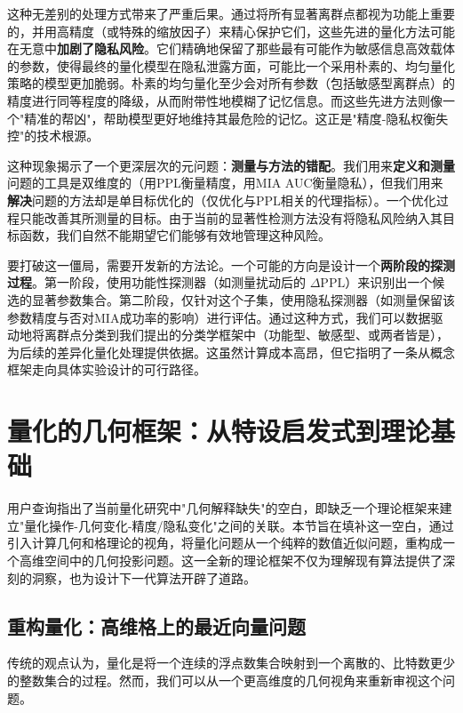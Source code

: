 \documentclass[letterpaper,twocolumn,10pt]{article}
\begin{document}
这种无差别的处理方式带来了严重后果。通过将所有显著离群点都视为功能上重要的，并用高精度（或特殊的缩放因子）来精心保护它们，这些先进的量化方法可能在无意中\textbf{加剧了隐私风险}。它们精确地保留了那些最有可能作为敏感信息高效载体的参数，使得最终的量化模型在隐私泄露方面，可能比一个采用朴素的、均匀量化策略的模型更加脆弱。朴素的均匀量化至少会对所有参数（包括敏感型离群点）的精度进行同等程度的降级，从而附带性地模糊了记忆信息。而这些先进方法则像一个"精准的帮凶"，帮助模型更好地维持其最危险的记忆。这正是"精度-隐私权衡失控"的技术根源。

这种现象揭示了一个更深层次的元问题：\textbf{测量与方法的错配}。我们用来\textbf{定义和测量}问题的工具是双维度的（用PPL衡量精度，用MIA AUC衡量隐私），但我们用来\textbf{解决}问题的方法却是单目标优化的（仅优化与PPL相关的代理指标）。一个优化过程只能改善其所测量的目标。由于当前的显著性检测方法没有将隐私风险纳入其目标函数，我们自然不能期望它们能够有效地管理这种风险。

要打破这一僵局，需要开发新的方法论。一个可能的方向是设计一个\textbf{两阶段的探测过程}。第一阶段，使用功能性探测器（如测量扰动后的 $\Delta \text{PPL}$）来识别出一个候选的显著参数集合。第二阶段，仅针对这个子集，使用隐私探测器（如测量保留该参数精度与否对MIA成功率的影响）进行评估。通过这种方式，我们可以数据驱动地将离群点分类到我们提出的分类学框架中（功能型、敏感型、或两者皆是），为后续的差异化量化处理提供依据。这虽然计算成本高昂，但它指明了一条从概念框架走向具体实验设计的可行路径。

\section{量化的几何框架：从特设启发式到理论基础}

用户查询指出了当前量化研究中"几何解释缺失"的空白，即缺乏一个理论框架来建立"量化操作-几何变化-精度/隐私变化"之间的关联。本节旨在填补这一空白，通过引入计算几何和格理论的视角，将量化问题从一个纯粹的数值近似问题，重构成一个高维空间中的几何投影问题。这一全新的理论框架不仅为理解现有算法提供了深刻的洞察，也为设计下一代算法开辟了道路。

\subsection{重构量化：高维格上的最近向量问题}

传统的观点认为，量化是将一个连续的浮点数集合映射到一个离散的、比特数更少的整数集合的过程。然而，我们可以从一个更高维度的几何视角来重新审视这个问题。
\end{document}
